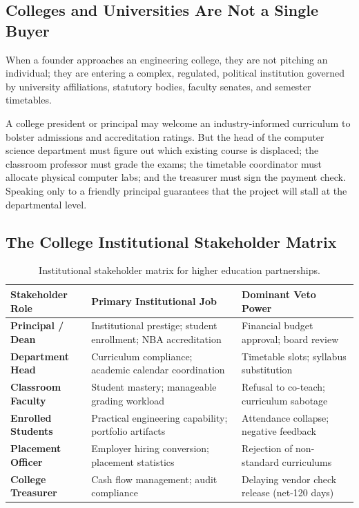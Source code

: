 \subsection{Colleges and Universities Are Not a Single Buyer}

When a founder approaches an engineering college, they are not pitching an individual; they are entering a complex, regulated, political institution governed by university affiliations, statutory bodies, faculty senates, and semester timetables.

A college president or principal may welcome an industry-informed curriculum to bolster admissions and accreditation ratings. But the head of the computer science department must figure out which existing course is displaced; the classroom professor must grade the exams; the timetable coordinator must allocate physical computer labs; and the treasurer must sign the payment check. Speaking only to a friendly principal guarantees that the project will stall at the departmental level.

\subsection{The College Institutional Stakeholder Matrix}

\begin{table}[h]
\centering
\small
\begin{tabularx}{\columnwidth}{>{\RaggedRight\bfseries}p{2.1cm} >{\RaggedRight}X >{\RaggedRight}p{2.2cm}}
\toprule
Stakeholder Role & Primary Institutional Job & Dominant Veto Power \\
\midrule
Principal / Dean & Institutional prestige; student enrollment; NBA accreditation & Financial budget approval; board review \\
\addlinespace
Department Head & Curriculum compliance; academic calendar coordination & Timetable slots; syllabus substitution \\
\addlinespace
Classroom Faculty & Student mastery; manageable grading workload & Refusal to co-teach; curriculum sabotage \\
\addlinespace
Enrolled Students & Practical engineering capability; portfolio artifacts & Attendance collapse; negative feedback \\
\addlinespace
Placement Officer & Employer hiring conversion; placement statistics & Rejection of non-standard curriculums \\
\addlinespace
College Treasurer & Cash flow management; audit compliance & Delaying vendor check release (net-120 days) \\
\bottomrule
\end{tabularx}
\caption{Institutional stakeholder matrix for higher education partnerships.}
\label{tab:ch6_college_matrix}
\end{table}

